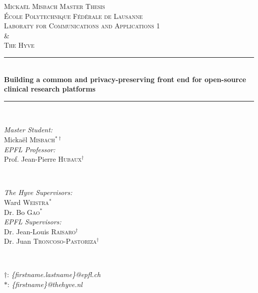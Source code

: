 \begin{titlepage}

\newcommand{\HRule}{\rule{\linewidth}{0.5mm}}
\center
 
\textsc{\LARGE Mickaël Misbach Master Thesis}\\[0.5cm]

\textsc{\Large École Polytechnique Fédérale de Lausanne}\\ 
\textsc{\large Laboraty for Communications and Applications 1}\\ 
\textsc{\Large \&}\\ 
\textsc{\Large The Hyve}\\[0.5cm] 

\HRule \\[0.4cm]
{ \huge \bfseries Building a common and privacy-preserving front end for open-source clinical research platforms}\\[0.4cm]
\HRule \\[1cm]

\begin{minipage}{0.4\textwidth}
\begin{flushleft} \large
\emph{Master Student:}\\
Mickaël \textsc{Misbach}$^{*\dagger}$\\[\baselineskip]
\emph{EPFL Professor:} \\
Prof. Jean-Pierre \textsc{Hubaux}$^\dagger$\\
\end{flushleft}
\end{minipage}
~
\begin{minipage}{0.5\textwidth}
\begin{flushright} \large
\emph{The Hyve Supervisors:} \\
Ward \textsc{Weistra}$^*$\\
Dr. Bo \textsc{Gao}$^*$\\[\baselineskip]
\emph{EPFL Supervisors:} \\
Dr. Jean-Louis \textsc{Raisaro}$^\dagger$\\
Dr. Juan \textsc{Troncoso-Pastoriza}$^\dagger$\\
\end{flushright}
\end{minipage}
~ \\[0.5cm]
\begin{minipage}{1\textwidth}
\begin{flushbottom}
\centering\small
$\dagger$: \emph{\{firstname.lastname\}@epfl.ch} \\
$*$: \emph{\{firstname\}@thehyve.nl} \\
\end{flushbottom}
\end{minipage}\\[1.5cm]



\end{titlepage}
